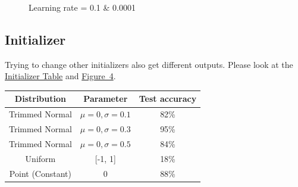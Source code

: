 \documentclass{article}
\begin{document}
\begin{figure}
	\centering
	\caption{Learning rate = 0.1 \& 0.0001}
	\label{fig-3}
\end{figure}


\subsection{Initializer}
Trying to change other initializers also get different outputs. Please look at the \hyperref[tab-7]{Initializer Table} and \hyperref[fig-4]{Figure~4}.
\begin{center}
	\label{tab-7}
	\begin{tabular}{ccc}
		\toprule
		Distribution & Parameter & Test accuracy \\
		\midrule
		Trimmed Normal & $\mu=0,\sigma=0.1$ & 82\% \\
		Trimmed Normal & $\mu=0,\sigma=0.3$ & 95\% \\
		Trimmed Normal & $\mu=0,\sigma=0.5$ & 84\% \\
		Uniform & [-1, 1] & 18\% \\
		Point (Constant) & 0 & 88\% \\
		\bottomrule
	\end{tabular}
\end{center}
\end{document}
